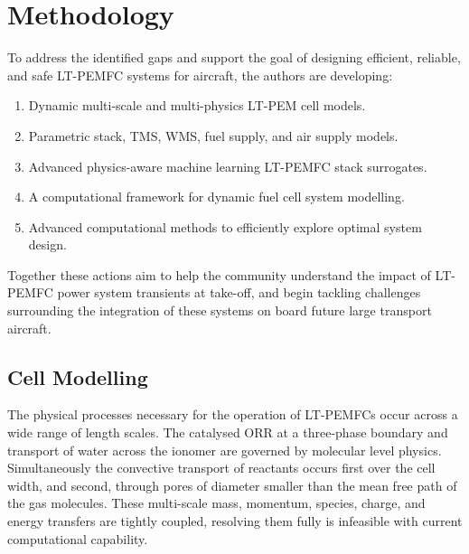 \section{Methodology} \label{sec:method}

To address the identified gaps and support the goal of designing efficient, reliable, and safe LT-PEMFC systems for aircraft, the authors are developing:

\begin{enumerate}
	\item Dynamic multi-scale and multi-physics LT-PEM cell models.
	\item Parametric stack, TMS, WMS, fuel supply, and air supply models.
	\item Advanced physics-aware machine learning LT-PEMFC stack surrogates.
	\item A computational framework for dynamic fuel cell system modelling.
	\item Advanced computational methods to efficiently explore optimal system design.
\end{enumerate}

Together these actions aim to help the community understand the impact of LT-PEMFC power system transients at take-off, and begin tackling challenges surrounding the integration of these systems on board future large transport aircraft.

\subsection{Cell Modelling}

The physical processes necessary for the operation of LT-PEMFCs occur across a wide range of length scales. The catalysed ORR at a three-phase boundary and transport of water across the ionomer are governed by molecular level physics. Simultaneously the convective transport of reactants occurs first over the cell width, and second, through pores of diameter smaller than the mean free path of the gas molecules. These multi-scale mass, momentum, species, charge, and energy transfers are tightly coupled, resolving them fully is infeasible with current computational capability.


